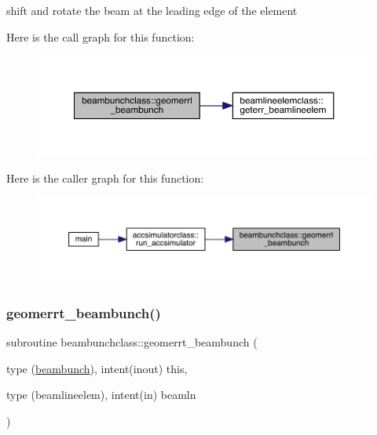 shift and rotate the beam at the leading edge of the element 

Here is the call graph for this function\+:\nopagebreak
\begin{figure}[H]
\begin{center}
\leavevmode
\includegraphics[width=350pt]{namespacebeambunchclass_aea8cfefa2f70ade95202cc40f015f7bf_cgraph}
\end{center}
\end{figure}
Here is the caller graph for this function\+:\nopagebreak
\begin{figure}[H]
\begin{center}
\leavevmode
\includegraphics[width=350pt]{namespacebeambunchclass_aea8cfefa2f70ade95202cc40f015f7bf_icgraph}
\end{center}
\end{figure}
\mbox{\label{namespacebeambunchclass_ab2f6f9e95d5786dab15c1b73f305e349}} 
\subsubsection{\texorpdfstring{geomerrt\_beambunch()}{geomerrt\_beambunch()}}
{\footnotesize\ttfamily subroutine beambunchclass\+::geomerrt\+\_\+beambunch (\begin{DoxyParamCaption}\item[{type (\mbox{\hyperlink{namespacebeambunchclass_structbeambunchclass_1_1beambunch}{beambunch}}), intent(inout)}]{this,  }\item[{type (beamlineelem), intent(in)}]{beamln }\end{DoxyParamCaption})}



